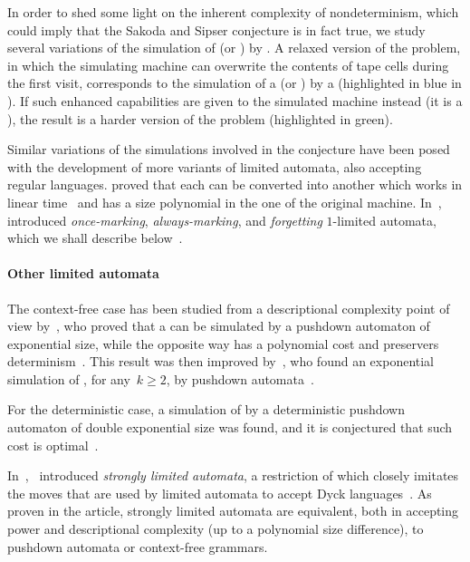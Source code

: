 In order to shed some light on the inherent complexity of nondeterminism, which could imply that the Sakoda and Sipser conjecture is in fact true, we study several variations of the simulation of \TNFA (or \ONFA) by \TDFA.
A relaxed version of the problem, in which the simulating machine can overwrite the contents of tape cells during the first visit, corresponds to the simulation of a \TNFA (or \ONFA) by a \ODLA (highlighted in blue in ).
If such enhanced capabilities are given to the simulated machine instead (\ie it is a \OLA), the result is a harder version of the problem (highlighted in green).

Similar variations of the simulations involved in the conjecture have been posed with the development of more variants of limited automata, also accepting regular languages.
\citeauthor{GuiPri19} proved that each \OLA can be converted into another \OLA which works in linear time~\cite{GuiPri19} and has a size polynomial in the one of the original machine.
In~\citeyear{PigPri23a},~\citeauthor{PigPri23a} introduced \emph{once-marking}, \emph{always-marking}, and \emph{forgetting} $1$-limited automata, which we shall describe below~\cite{PigPri23a,PigPri23}.


\paragraph{Other limited automata}
The context-free case has been studied from a descriptional complexity point of view by~\citeauthor{PigPis15}, who proved that a  can be simulated by a pushdown automaton of exponential size, while the opposite way has a polynomial cost and preservers determinism~\cite{PigPis15}.
This result was then improved by~\citeauthor{KutPig+18}, who found an exponential simulation of \kLAs, for any~$k\ge2$, by pushdown automata~\cite{KutPig+18}.

For the deterministic case, a simulation of  by a deterministic pushdown automaton of double exponential size was found, and it is conjectured that such cost is optimal~\cite{PigPis15}.

In~\citeyear{Pig16},~\citeauthor{Pig16} introduced \emph{strongly limited automata}, a restriction of  which closely imitates the moves that are used by limited automata to accept Dyck languages~\cite{Pig16}.
As proven in the article, strongly limited automata are equivalent, both in accepting power and descriptional complexity (up to a polynomial size difference), to pushdown automata or context-free grammars.

